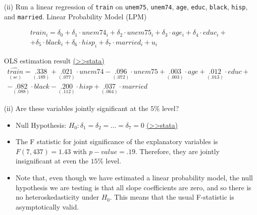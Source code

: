 \documentclass[
  10pt,
  ignorenonframetext,
]{beamer}
\begin{document}
\begin{frame}{(ii) Run a linear regression of \texttt{train} on
\texttt{unem75}, \texttt{unem74}, \texttt{age}, \texttt{educ},
\texttt{black}, \texttt{hisp}, and \texttt{married}.}
\protect\hypertarget{ii-run-a-linear-regression-of-train-on-unem75-unem74-age-educ-black-hisp-and-married.}{}
Linear Probability Model (LPM)

\[
\begin{aligned}
train_i = \delta_0 + \delta_1 \cdot unem74_i + \delta_2 \cdot unem75_i + \delta_3 \cdot age_i + \delta_4 \cdot educ_i +\\
+ \delta_5 \cdot black_i + \delta_6 \cdot hisp_i + \delta_7 \cdot married_i + u_i
\end{aligned}
\]

OLS estimation result
\footnotesize \protect\hyperlink{LMPtrain_norobust}{(\textgreater\textgreater stata)}
\small \[
\begin{aligned}
\underset{(se)}{\widehat{train}} = \underset{(.189)}{.338} + \underset{(.077)}{.021} \cdot unem74 - \underset{(.072)}{.096} \cdot unem75 + \underset{(.003)}{.003} \cdot age + \underset{(.013)}{.012} \cdot educ +\\- \underset{(.088)}{.082} \cdot black - \underset{(.112)}{.200} \cdot hisp + \underset{(.064)}{.037} \cdot married
\end{aligned}
\]
\end{frame}

\begin{frame}{(ii) Are these variables jointly significant at the
\(5\%\) level?}
\protect\hypertarget{ii-are-these-variables-jointly-significant-at-the-5-level}{}
\begin{itemize}
\item
  Null Hypothesis: \(H_0: \delta_1 = \delta_2 = \ldots = \delta_7 = 0\)
  \footnotesize \protect\hyperlink{LMPtrain_norobust}{(\textgreater\textgreater stata)}
  \normalsize
\item
  The F statistic for joint significance of the explanatory variables is
  \(F(7,437) = 1.43\) with \(p-value = .19\). Therefore, they are
  jointly insignificant at even the \(15\%\) level.
\item
  Note that, even though we have estimated a linear probability model,
  the null hypothesis we are testing is that all slope coefficients are
  zero, and so there is no heteroskedasticity under \(H_0\). This means
  that the usual F-statistic is asymptotically valid.
\end{itemize}
\end{frame}
\end{document}
